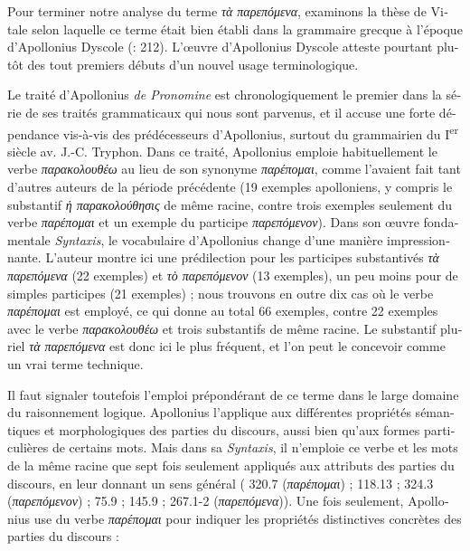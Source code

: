 \documentclass[output=paper]{langsci/langscibook}
\begin{document}
\begin{otherlanguage}{french}
Pour terminer notre analyse du terme \textit{τὰ παρεπόμενα}, examinons la thèse de Vitale selon laquelle ce terme était bien établi dans la grammaire grecque à l’époque d’Apollonius Dyscole (\citealt{vitale_per_1982}: 212). L’œuvre d’Apollonius Dyscole atteste pourtant plutôt des tout premiers débuts d’un nouvel usage terminologique. 

Le traité d’Apollonius \textit{de Pronomine} est chronologiquement le premier dans la série de ses traités grammaticaux qui nous sont parvenus, et il accuse une forte dépendance vis-à-vis des prédécesseurs d’Apollonius, surtout du grammairien du I\textsuperscript{er} siècle av. J.-C. Tryphon. Dans ce traité, Apollonius emploie habituellement le verbe \textit{παρακολουθέω} au lieu de son synonyme \textit{παρέπομαι}, comme l’avaient fait tant d’autres auteurs de la période précédente (19 exemples apolloniens, y compris le substantif \textit{ἡ παρακολούθησις} de même racine, contre trois exemples seulement du verbe \textit{παρέπομαι} et un exemple du participe \textit{παρεπόμενον}). Dans son œuvre fondamentale \textit{Syntaxis}, le vocabulaire d’Apollonius change d’une manière impressionnante. L’auteur montre ici une prédilection pour les participes substantivés \textit{τὰ παρεπόμενα} (22 exemples) et \textit{τὸ παρεπόμενον} (13 exemples), un peu moins pour de simples participes (21 exemples) ; nous trouvons en outre dix cas où le verbe \textit{παρέπομαι} est employé, ce qui donne au total 66 exemples, contre 22 exemples avec le verbe \textit{παρακολουθέω} et trois substantifs de même racine. Le substantif pluriel \textit{τὰ παρεπόμενα} est donc ici le plus fréquent, et l’on peut le concevoir comme un vrai terme technique. 

Il faut signaler toutefois l’emploi prépondérant de ce terme dans le large domaine du raisonnement logique. Apollonius l’applique aux différentes propriétés sémantiques et morphologiques des parties du discours, aussi bien qu’aux formes particulières de certains mots. Mais dans sa \textit{Syntaxis}, il n’emploie ce verbe et les mots de la même racine que sept fois seulement appliqués aux attributs des parties du discours, en leur donnant un sens général ( 320.7 (\textit{παρέπομαι}) ; 118.13 ; 324.3 (\textit{παρεπόμενον}) ; 75.9 ; 145.9 ; 267.1-2 (\textit{παρεπόμενα})). Une fois seulement, Apollonius use du verbe \textit{παρέπομαι} pour indiquer les propriétés distinctives concrètes des parties du discours :


\end{otherlanguage}
\end{document}
